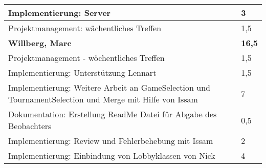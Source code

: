 \documentclass[a4paper,11pt]{scrartcl}
\begin{document}
\begin{longtable}{| p{13.8cm} | C{2.4cm} |}
  Implementierung: Server
	&
  3
	\\
	\hline

  Projektmanagement: wächentliches Treffen
	&
  1,5
	\\
	\hline
	\hline


	\textbf{Willberg, Marc} & \textbf{16,5}\\ %
	\hline

  Projektmanagement - wöchentliches Treffen
	&
  1,5
	\\
	\hline

  Implementierung: Unterstützung Lennart
	&
  1,5
	\\
	\hline

  Implementierung: Weitere Arbeit an GameSelection und TournamentSelection und Merge mit Hilfe von Issam
	&
  7
	\\
	\hline

  Dokumentation: Erstellung ReadMe Datei für Abgabe des Beobachters
	&
  0,5
	\\
	\hline

  Implementierung: Review und Fehlerbehebung mit Issam
	&
  2
	\\
	\hline

  Implementierung: Einbindung von Lobbyklassen von Nick
	&
  4
	\\
	\hline


\end{longtable}
\end{document}
